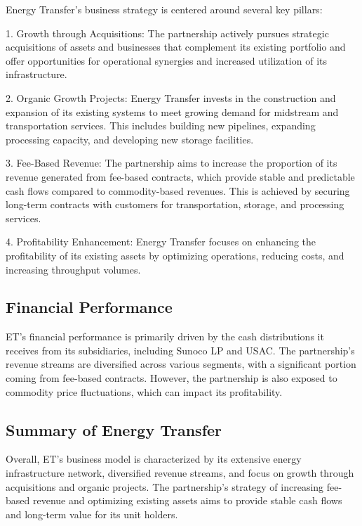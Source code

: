 \documentclass[9pt,a4paper,twoside]{tau}
\begin{document}
        Energy Transfer's business strategy is centered around several key pillars:
        
        1. Growth through Acquisitions: The partnership actively pursues strategic acquisitions of assets and businesses that complement its existing portfolio and offer opportunities for operational synergies and increased utilization of its infrastructure\cite{energy-transfer-2024}.
        
        2. Organic Growth Projects: Energy Transfer invests in the construction and expansion of its existing systems to meet growing demand for midstream and transportation services. This includes building new pipelines, expanding processing capacity, and developing new storage facilities\cite{energy-transfer-2024}.
        
        3. Fee-Based Revenue: The partnership aims to increase the proportion of its revenue generated from fee-based contracts, which provide stable and predictable cash flows compared to commodity-based revenues. This is achieved by securing long-term contracts with customers for transportation, storage, and processing services\cite{energy-transfer-2024}.
        
        4. Profitability Enhancement: Energy Transfer focuses on enhancing the profitability of its existing assets by optimizing operations, reducing costs, and increasing throughput volumes\cite{energy-transfer-2024}.

    \subsection{Financial Performance}
    
        ET's financial performance is primarily driven by the cash distributions it receives from its subsidiaries, including Sunoco LP and USAC. The partnership's revenue streams are diversified across various segments, with a significant portion coming from fee-based contracts. However, the partnership is also exposed to commodity price fluctuations, which can impact its profitability\cite{energy-transfer-2024}.
    
    \subsection{Summary of Energy Transfer}
        
        Overall, ET's business model is characterized by its extensive energy infrastructure network, diversified revenue streams, and focus on growth through acquisitions and organic projects. The partnership's strategy of increasing fee-based revenue and optimizing existing assets aims to provide stable cash flows and long-term value for its unit holders.
\end{document}

